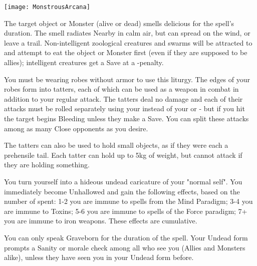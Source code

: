   \begin{center}
  \texttt{[image: MonstrousArcana]}
  \end{center}


\MYSTERY [
  Name = Tasty,
  Link = arcana-mystery-tasty,
  Paradigm = Biomancy,
  Save = N,
  Duration = Combat or \SUM Minutes,
  Target = Close Target(s)
]

The target object or Monster (alive or dead) smells delicious for the spell's duration.  The smell radiates Nearby in calm air, but can spread on the wind, or leave a trail.  Non-intelligent zoological creatures and swarms will be attracted to and attempt to eat the object or Monster first (even if they are supposed to be allies); intelligent creatures get a Save at a -\DICE penalty. 

\MYSTERY [
  Name = Tattered Robe,
  Link = arcana-mystery-tattered-robe,
  Paradigm = Entropy,
  Save = Y (neg.),
  Duration = Combat or \SUM Minutes,
  Target = Self
]

You must be wearing robes without armor to use this liturgy.  The edges of your robes form into \DICE tatters, each of which can be used as a weapon in combat in addition to your regular attack. The tatters deal no damage and each of their attacks must be rolled separately using your \FOC instead of your \VIG or \DEX - but if you hit the target begins Bleeding unless they make a Save.  You can split these attacks among as many Close opponents as you desire.

The tatters can also be used to hold small objects, as if they were each a prehensile tail.  Each tatter can hold up to 5kg of weight, but cannot attack if they are holding something.

\MYSTERY [
  Name = Undead Visage,
  Link = arcana-mystery-undead-visage,
  Paradigm = Death,
  Save = n/a,
  Duration = Combat or \SUM Minutes,
  Target = Self
]

You turn yourself into a hideous undead caricature of your "normal self".  You immediately become Unhallowed and gain the following effects, based on the number of \DICE spent:  1-2 you are immune to spells from the Mind Paradigm; 3-4 you are immune to Toxins; 5-6 you are immune to spells of the Force paradigm; 7+  you are immune to iron weapons.  These effects are cumulative.

You can only speak Graveborn for the duration of the spell.  Your Undead form prompts a Sanity or morale check among all who see you (Allies and Monsters alike), unless they have seen you in your Undead form before. 



